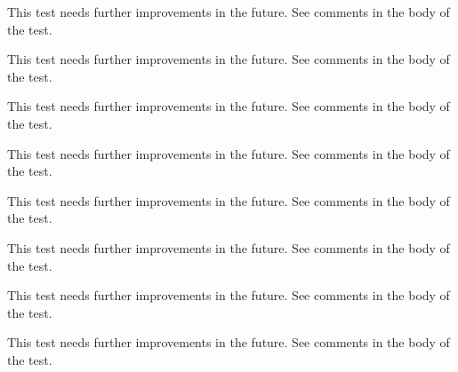 \begin{DoxyRefList}
%
 This test needs further improvements in the future. See comments in the body of the test.  
\item[Subprogram \mbox{\hyperlink{namespaceTest__System__mod_a8d37f80583c104a3dfb6b99a897feb26}{Test\+\_\+\+System\+\_\+mod\+::test\+\_\+execute\+Cmd\+\_\+1}} ()]\label{todo__todo000072}%
%
 This test needs further improvements in the future. See comments in the body of the test.  
\item[Subprogram \mbox{\hyperlink{namespaceTest__System__mod_a733db17082cd5058dbc8d19e6f620909}{Test\+\_\+\+System\+\_\+mod\+::test\+\_\+execute\+Cmd\+\_\+2}} ()]\label{todo__todo000073}%
%
 This test needs further improvements in the future. See comments in the body of the test.  
\item[Subprogram \mbox{\hyperlink{namespaceTest__System__mod_a9a276bf5a7b9db66c140bd2202ebc7e9}{Test\+\_\+\+System\+\_\+mod\+::test\+\_\+get\+System\+Info\+\_\+1}} ()]\label{todo__todo000074}%
%
 This test needs further improvements in the future. See comments in the body of the test.  
\item[Subprogram \mbox{\hyperlink{namespaceTest__System__mod_aabfd080659733c4a852c62ccd400599b}{Test\+\_\+\+System\+\_\+mod\+::test\+\_\+\+OS\+\_\+type\+\_\+1}} ()]\label{todo__todo000068}%
%
 This test needs further improvements in the future. See comments in the body of the test.  
\item[Subprogram \mbox{\hyperlink{namespaceTest__System__mod_a86976d55b3a779d9a8c0064155e9cd4a}{Test\+\_\+\+System\+\_\+mod\+::test\+\_\+\+OS\+\_\+type\+\_\+2}} ()]\label{todo__todo000069}%
%
 This test needs further improvements in the future. See comments in the body of the test.  
\item[Subprogram \mbox{\hyperlink{namespaceTest__System__mod_ada729e6f3789a1df730ac21f58d5a334}{Test\+\_\+\+System\+\_\+mod\+::test\+\_\+\+OS\+\_\+type\+\_\+3}} ()]\label{todo__todo000070}%
%
 This test needs further improvements in the future. See comments in the body of the test.  
\item[Subprogram \mbox{\hyperlink{namespaceTest__System__mod_a6ba8a4348e2457b775dd061d40f33cb8}{Test\+\_\+\+System\+\_\+mod\+::test\+\_\+\+Sys\+Cmd\+\_\+type\+\_\+1}} ()]\label{todo__todo000071}%
%
 This test needs further improvements in the future. See comments in the body of the test. 
\end{DoxyRefList}